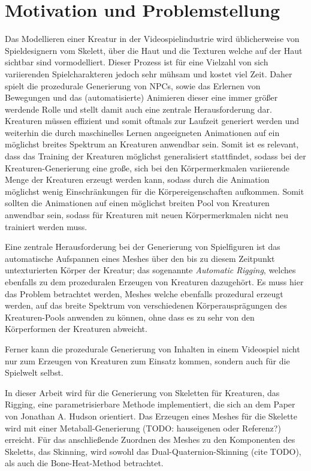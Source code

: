 \section{Motivation und Problemstellung}

Das Modellieren einer Kreatur in der Videospielindustrie wird üblicherweise von Spieldesignern vom Skelett, über die Haut und die Texturen welche auf der Haut sichtbar sind vormodelliert. Dieser Prozess ist für eine Vielzahl von sich variierenden Spielcharakteren jedoch sehr mühsam und kostet viel Zeit. Daher spielt die prozedurale Generierung von NPCs, sowie das Erlernen von Bewegungen und das (automatisierte) Animieren dieser eine immer größer werdende Rolle und stellt damit auch eine zentrale Herausforderung dar. Kreaturen müssen effizient und somit oftmals zur Laufzeit generiert werden und weiterhin die durch maschinelles Lernen angeeigneten Animationen auf ein möglichst breites Spektrum an Kreaturen anwendbar sein. Somit ist es relevant, dass das Training der Kreaturen möglichst generalisiert stattfindet, sodass bei der Kreaturen-Generierung eine große, sich bei den Körpermerkmalen variierende Menge der Kreaturen erzeugt werden kann, sodass durch die Animation möglichst wenig Einschränkungen für die Körpereigenschaften aufkommen. Somit sollten die Animationen auf einen möglichst breiten Pool von Kreaturen anwendbar sein, sodass für Kreaturen mit neuen Körpermerkmalen nicht neu trainiert werden muss.

Eine zentrale Herausforderung bei der Generierung von Spielfiguren ist das automatische Aufspannen eines Meshes über den bis zu diesem Zeitpunkt untexturierten Körper der Kreatur; das sogenannte \textit{Automatic Rigging}, welches ebenfalls zu dem prozeduralen Erzeugen von Kreaturen dazugehört. Es muss hier das Problem betrachtet werden, Meshes welche ebenfalls prozedural erzeugt werden, auf das breite Spektrum von verschiedenen Körperausprägungen des Kreaturen-Pools anwenden zu können, ohne dass es zu sehr von den Körperformen der Kreaturen abweicht.

Ferner kann die prozedurale Generierung von Inhalten in einem Videospiel nicht nur zum Erzeugen von Kreaturen zum Einsatz kommen, sondern auch für die Spielwelt selbst. 

In dieser Arbeit wird für die Generierung von Skeletten für Kreaturen, das Rigging, eine parametrisierbare Methode implementiert, die sich an dem Paper \cite{Hudson2013CreatureGU} von Jonathan A. Hudson orientiert. Das Erzeugen eines Meshes für die Skelette wird mit einer Metaball-Generierung (TODO: hauseigenen oder Referenz?) erreicht. Für das anschließende Zuordnen des Meshes zu den Komponenten des Skeletts, das Skinning, wird sowohl das Dual-Quaternion-Skinning (cite TODO), als auch die Bone-Heat-Method \cite{bone_heat_paper} betrachtet. 

